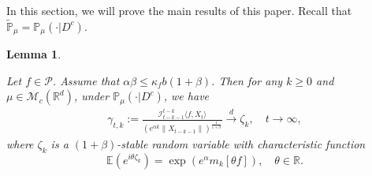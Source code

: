 \documentclass[12pt]{amsart}
\theoremstyle{plain}
\newtheorem{lem}[thm]{Lemma}
\theoremstyle{definition}
\numberwithin{equation}{section}
\begin{document}
In this section, we will prove the main results of this paper. Recall that $\mathbb{\tilde{P}}_{\mu}=\mathbb{P}_{\mu}(\cdot|D^c)$.
\begin{comment}
\begin{lem}\label{lemma32}
    Write $\mathcal{A}_t(\epsilon)=\{\|X_t\|\in\|\mu\|(e^{(\alpha-\epsilon)t},e^{(\alpha+\epsilon)t})\},$ for each $\epsilon,t>0$.
    Then for any $\epsilon>0$, we have
\begin{align}
    \lim_{t\rightarrow\infty}\mathcal{A}_t(\epsilon)=D^c, ~~\mathbb{P}_{\mu}\text{-}{\rm a.s}.
\end{align}
\end{lem}
\begin{proof}
    We just need to prove
    \begin{align}
        D^c \subset \liminf_{t\rightarrow\infty}\mathcal{A}_t(\epsilon)\subset \limsup_{t\rightarrow\infty}\mathcal{A}_t(\epsilon)\subset D^c,~~\mathbb{P}_{\mu}\text{-}{\rm a.s}.
    \end{align}

    On one hand, let $\omega\in D$. Then there exists $T(\omega)>0$, such that $\|X_t(\omega)\|=0,$ for each $t\geq T(\omega)$.
    Thus $\omega\notin  \limsup_{t\rightarrow\infty}\mathcal{A}_t(\epsilon)=\cap_{s\geq 0}\cup_{t\geq s}\mathcal{A}_t(\epsilon)$.
    This implies that $\limsup_{t\rightarrow\infty}\mathcal{A}_t(\epsilon)\subset D^c$.


    On the other hand, let $\omega \in \{H_{\infty}>0\}\cap\{\lim_{t\rightarrow \infty} H_t=H_{\infty}\}$.
    Then, there exists $\delta>0$ such that $H_{\infty}(\omega)\in(\delta,\frac{1}{\delta})$ and there exists $S_1>0$ such that for any $t\geq S_1$, we have $\frac{\delta}{2}\leq H_t(\omega)\leq 2\delta$.
    Taking $S_2>0$ such that for any $t>S_2$, $\|\mu\|e^{-\epsilon t}<\frac{\delta}{2}$ and $\|\mu\|e^{\epsilon t}>2\delta$.
    Then $\omega\in \mathcal{A}_t(\epsilon),$ for each $t>S:=\max\{S_1,S_2\}$.
    This implies that $\omega \in \liminf_{t\rightarrow \infty}\mathcal{A}_t(\epsilon):=\cup_{s>0}\cap_{t\geq s}\mathcal{A}_t(\epsilon)$.
    According to \cite{LSR}, $D^c=\{H_{\infty}>0\}\cap\{\lim_{t\rightarrow \infty} H_t=H_{\infty}\}, \mathbb{P}_{\mu}$-a.s.. Using this we get the desired result.
\end{proof}
\end{comment}
\begin{lem}\label{lem: mainlemma}

Let $f\in \mathcal{P}$.
Assume that $\alpha\beta\leq \kappa_fb(1+\beta)$.
Then for any $k\geq 0$ and $\mu \in \mathcal{M}_c(\mathbb{R}^d)$, under $\mathbb{P}_{\mu}(\cdot | D ^c)$, we have
 \begin{align}
      \gamma_{t,k}:=\frac{\mathcal I_{t-k-1}^{t-k}\langle f ,X_t\rangle}{(e^{\alpha k}\|X_{t-k-1}\|)^{\frac{1}{1+\beta}}}\xrightarrow{d}\zeta_k, \quad t\rightarrow \infty, \label{limitdistribution1}
 \end{align}
 where $\zeta_k$ is a $(1+\beta)$-stable random variable with characteristic function
 $$\mathbb{E}(e^{i\theta\zeta_k})=\exp(e^{\alpha}m_k[\theta f]),\quad \theta \in \mathbb R.$$
 \end{lem}
\end{document}
